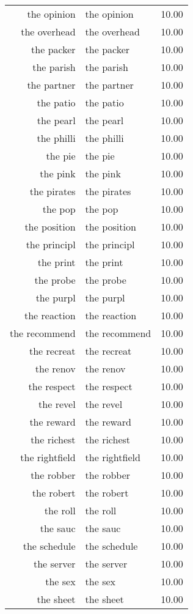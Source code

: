 \begin{table}[ht]
\begin{tabular}{rlr}
  the opinion & the opinion & 10.00 \\ 
  the overhead & the overhead & 10.00 \\ 
  the packer & the packer & 10.00 \\ 
  the parish & the parish & 10.00 \\ 
  the partner & the partner & 10.00 \\ 
  the patio & the patio & 10.00 \\ 
  the pearl & the pearl & 10.00 \\ 
  the philli & the philli & 10.00 \\ 
  the pie & the pie & 10.00 \\ 
  the pink & the pink & 10.00 \\ 
  the pirates & the pirates & 10.00 \\ 
  the pop & the pop & 10.00 \\ 
  the position & the position & 10.00 \\ 
  the principl & the principl & 10.00 \\ 
  the print & the print & 10.00 \\ 
  the probe & the probe & 10.00 \\ 
  the purpl & the purpl & 10.00 \\ 
  the reaction & the reaction & 10.00 \\ 
  the recommend & the recommend & 10.00 \\ 
  the recreat & the recreat & 10.00 \\ 
  the renov & the renov & 10.00 \\ 
  the respect & the respect & 10.00 \\ 
  the revel & the revel & 10.00 \\ 
  the reward & the reward & 10.00 \\ 
  the richest & the richest & 10.00 \\ 
  the rightfield & the rightfield & 10.00 \\ 
  the robber & the robber & 10.00 \\ 
  the robert & the robert & 10.00 \\ 
  the roll & the roll & 10.00 \\ 
  the sauc & the sauc & 10.00 \\ 
  the schedule & the schedule & 10.00 \\ 
  the server & the server & 10.00 \\ 
  the sex & the sex & 10.00 \\ 
  the sheet & the sheet & 10.00 \\ 

\end{tabular}
\end{table}
